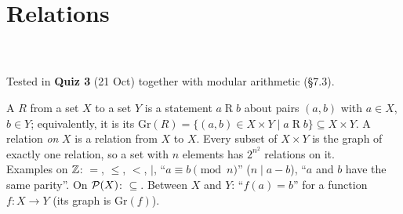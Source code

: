 \chapter{Relations}
%
{\\ \\ Tested in \textbf{Quiz 3} (21 Oct) together with modular arithmetic (\S7.3).}


\begin{key}[Relation]
A  $R$ from a set $X$ to a set $Y$ is a statement $a\mathrel Rb$ about pairs $(a,b)$ with $a\in X$, $b\in Y$; equivalently, it is its  $\mathrm{Gr}(R)=\{(a,b)\in X\times Y\mid a\mathrel Rb\}\subseteq X\times Y$. A relation \emph{on} $X$ is a relation from $X$ to $X$. Every subset of $X\times Y$ is the graph of exactly one relation, so a set with $n$ elements has $2^{n^2}$ relations on it.\\
Examples on $\mathbb{Z}$: $=$, $\le$, $<$, $\mid$, ``$a\equiv b\pmod n$'' (\ie $n\mid a-b$), ``$a$ and $b$ have the same parity''. On $\mathcal{P}(X)$: $\subseteq$. Between $X$ and $Y$: ``$f(a)=b$'' for a function $f:X\to Y$ (its graph is $\mathrm{Gr}(f)$).
\end{key}

